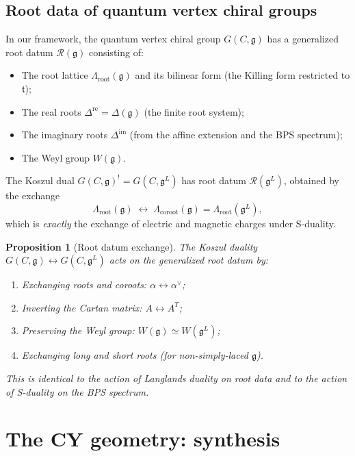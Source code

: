 \documentclass[11pt]{article}
\newtheorem{proposition}[theorem]{Proposition}
\theoremstyle{definition}
\theoremstyle{remark}
\newcommand{\g}{\mathfrak{g}}
\newcommand{\gL}{\mathfrak{g}^L}
\begin{document}
\subsection{Root data of quantum vertex chiral groups}

In our framework, the quantum vertex chiral group $G(C,\g)$ has a generalized
root datum $\mathcal{R}(\g)$ consisting of:
\begin{itemize}
 \item The root lattice $\Lambda_{\mathrm{root}}(\g)$ and its bilinear form
 (the Killing form restricted to $\mathfrak{t}$);
 \item The real roots $\Delta^{\mathrm{re}} = \Delta(\g)$ (the finite root
 system);
 \item The imaginary roots $\Delta^{\mathrm{im}}$ (from the affine extension
 and the BPS spectrum);
 \item The Weyl group $W(\g)$.
\end{itemize}

The Koszul dual $G(C,\g)^! = G(C,\gL)$ has root datum $\mathcal{R}(\gL)$,
obtained by the exchange
\[
 \Lambda_{\mathrm{root}}(\g) \;\longleftrightarrow\;
 \Lambda_{\mathrm{coroot}}(\g) = \Lambda_{\mathrm{root}}(\gL),
\]
which is \emph{exactly} the exchange of electric and magnetic charges under
S-duality.

\begin{proposition}[Root datum exchange]
\label{prop:root-exchange}
The Koszul duality $G(C,\g) \leftrightarrow G(C,\gL)$ acts on the generalized
root datum by:
\begin{enumerate}[label=(\roman*)]
 \item Exchanging roots and coroots: $\alpha \leftrightarrow \alpha^\vee$;
 \item Inverting the Cartan matrix: $A \leftrightarrow A^T$;
 \item Preserving the Weyl group: $W(\g) \simeq W(\gL)$;
 \item Exchanging long and short roots (for non-simply-laced $\g$).
\end{enumerate}
This is identical to the action of Langlands duality on root data and to the
action of S-duality on the BPS spectrum.
\end{proposition}


\section{The CY geometry: synthesis}
\label{sec:synthesis}
\end{document}
